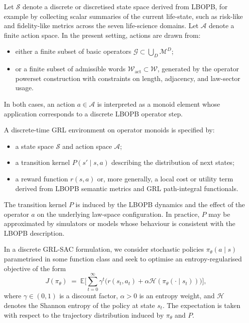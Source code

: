 \documentclass[11pt]{book}
\theoremstyle{plain}
\theoremstyle{definition}
\theoremstyle{remark}
\begin{document}
Let $\mathcal{S}$ denote a discrete or discretised state space derived
from LBOPB, for example by collecting scalar summaries of the current
life-state, such as risk-like and fidelity-like metrics across the
seven life-science domains. Let $\mathcal{A}$ denote a finite action
space. In the present setting, actions are drawn from:
\begin{itemize}
  \item either a finite subset of basic operators
        $\mathcal{G} \subset \bigcup_{D} \mathcal{M}^{D}$;
  \item or a finite subset of admissible words
        $\mathcal{W}_{\mathrm{act}} \subset \mathcal{W}$,
        generated by the operator powerset construction with
        constraints on length, adjacency, and law-sector usage.
\end{itemize}
In both cases, an action $a \in \mathcal{A}$ is interpreted as a
monoid element whose application corresponds to a discrete LBOPB
operator step.

A discrete-time GRL environment on operator monoids is specified by:
\begin{itemize}
  \item a state space $\mathcal{S}$ and action space $\mathcal{A}$;
  \item a transition kernel
        $P(s' \mid s,a)$ describing the distribution of next states;
  \item a reward function $r(s,a)$ or, more generally, a local cost
        or utility term derived from LBOPB semantic metrics and GRL
        path-integral functionals.
\end{itemize}
The transition kernel $P$ is induced by the LBOPB dynamics and the
effect of the operator $a$ on the underlying law-space configuration.
In practice, $P$ may be approximated by simulators or models whose
behaviour is consistent with the LBOPB description.

In a discrete GRL-SAC formulation, we consider stochastic policies
$\pi_{\theta}(a \mid s)$ parametrised in some function class and seek
to optimise an entropy-regularised objective of the form
\[
  J(\pi_{\theta})
  \;=\;
  \mathbb{E}\Biggl[
    \sum_{t=0}^{\infty}
    \gamma^{t} \bigl(
      r(s_{t},a_{t}) + \alpha \mathcal{H}(\pi_{\theta}(\cdot \mid s_{t}))
    \bigr)
  \Biggr],
\]
where $\gamma \in (0,1)$ is a discount factor, $\alpha > 0$ is an
entropy weight, and $\mathcal{H}$ denotes the Shannon entropy of the
policy at state $s_{t}$. The expectation is taken with respect to the
trajectory distribution induced by $\pi_{\theta}$ and $P$.
\end{document}
